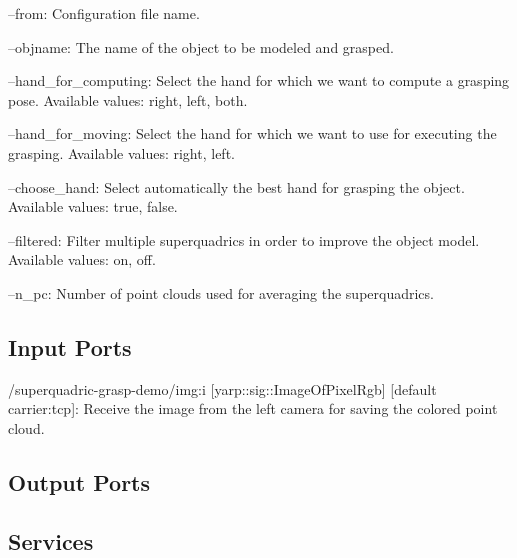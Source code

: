 \begin{DoxyItemize}
\item --from\+: Configuration file name.
\item --objname\+: The name of the object to be modeled and grasped.
\item --hand\+\_\+for\+\_\+computing\+: Select the hand for which we want to compute a grasping pose. Available values\+: right, left, both.
\item --hand\+\_\+for\+\_\+moving\+: Select the hand for which we want to use for executing the grasping. Available values\+: right, left.
\item --choose\+\_\+hand\+: Select automatically the best hand for grasping the object. Available values\+: true, false.
\item --filtered\+: Filter multiple superquadrics in order to improve the object model. Available values\+: on, off.
\item --n\+\_\+pc\+: Number of point clouds used for averaging the superquadrics. 
\end{DoxyItemize}\hypertarget{group__superquadric-grasp-demo_inputports_sec}{}\subsection{Input Ports}\label{group__superquadric-grasp-demo_inputports_sec}

\begin{DoxyItemize}
\item /superquadric-\/grasp-\/demo/img\+:i \mbox{[}yarp\+::sig\+::\+Image\+Of\+Pixel\+Rgb\mbox{]} \mbox{[}default carrier\+:tcp\mbox{]}\+: Receive the image from the left camera for saving the colored point cloud.
\end{DoxyItemize}\hypertarget{group__superquadric-grasp-demo_outputports_sec}{}\subsection{Output Ports}\label{group__superquadric-grasp-demo_outputports_sec}
\hypertarget{group__superquadric-grasp-demo_services_sec}{}\subsection{Services}\label{group__superquadric-grasp-demo_services_sec}

